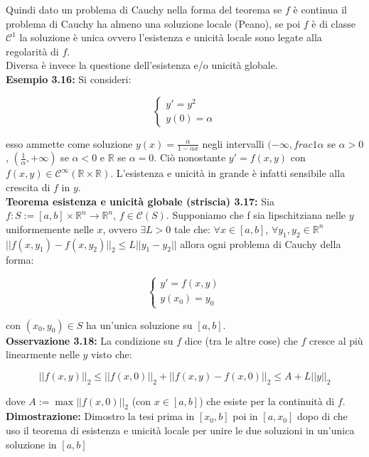 \documentclass[a4paper,11pt,titlepage]{book}
\begin{document}
Quindi dato un problema di Cauchy nella forma del teorema se $f$ è continua il problema di Cauchy ha almeno una soluzione locale (Peano), se poi $f$ è di classe $\mathcal{C}^1$ la soluzione è unica ovvero l'esistenza e unicità locale sono legate alla regolarità di $f$.\\

Diversa è invece la questione dell'esistenza e/o unicità globale.\\

\textbf{Esempio 3.16:} Si consideri:

$$\begin{cases}
y'=y^2 \\
y(0)=\alpha
\end{cases}$$

esso ammette come soluzione $y(x)=\frac{\alpha}{1-\alpha x}$ negli intervalli $(-\infty,frac{1}{\alpha}$ se $\alpha>0$, $(\frac{1}{\alpha},+\infty)$ se $\alpha<0$ e $\mathbb{R}$ se $\alpha=0$. Ciò nonostante $y'=f(x,y)$ con $f(x,y)\in\mathcal{C}^\infty(\mathbb{R}\times\mathbb{R})$. L'esistenza e unicità in grande è infatti sensibile alla crescita di $f$ in $y$.\\

\textbf{Teorema esistenza e unicità globale (striscia) 3.17:} Sia $f:S:=[a,b]\times\mathbb{R}^n\to\mathbb{R}^n$, $f\in\mathcal{C}(S)$. Supponiamo che f sia lipschitziana nelle $y$ uniformemente nelle $x$, ovvero $\exists L>0$ tale che: $\forall x\in [a,b]$, $\forall y_1,y_2\in\mathbb{R}^n$  $||f(x,y_1)-f(x,y_2)||_2\leq L||y_1-y_2||$ allora ogni problema di Cauchy della forma:

$$\begin{cases}
y'=f(x,y)\\
y(x_0)=y_0
\end{cases}$$

con $(x_0,y_0)\in S$ ha un'unica soluzione su $[a,b]$.\\

\textbf{Osservazione 3.18:} La condizione su $f$ dice (tra le altre cose) che $f$ cresce al più linearmente nelle $y$ visto che:

$$||f(x,y)||_2\leq ||f(x,0)||_2 +||f(x,y)-f(x,0)||_2\leq A+L||y||_2$$

dove $A:=\max ||f(x,0)||_2$ (con $x\in[a,b]$) che esiste per la continuità di $f$.\\

\textbf{Dimostrazione:} Dimostro la tesi prima in $[x_0,b]$ poi in $[a,x_0]$ dopo di che uso il teorema di esistenza e unicità locale per unire le due soluzioni in un'unica soluzione in $[a,b]$\\
\end{document}
